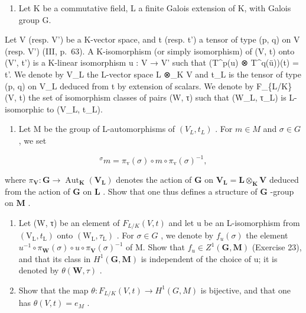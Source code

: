 \begin{enumerate}
\def\labelenumi{\arabic{enumi})}
\setcounter{enumi}{23}
\tightlist
\item
  Let K be a commutative field, L a finite Galois extension of K, with Galois group G.
\end{enumerate}

Let V (resp. V') be a K-vector space, and t (resp. t') a tensor of type (p, q) on V (resp. V') (III, p.~63). A K-isomorphism (or simply isomorphism) of (V, t) onto (V', t') is a K-linear isomorphism u : V → V' such that (T\^{}p(u) ⊗ T\^{}q(ü))(t) = t'. We denote by V\_L the L-vector space L ⊗\_K V and t\_L is the tensor of type (p, q) on V\_L deduced from t by extension of scalars. We denote by F\_\{L/K\}(V, t) the set of isomorphism classes of pairs (W, τ) such that (W\_L, τ\_L) is L-isomorphic to (V\_L, t\_L).

\begin{enumerate}
\def\labelenumi{\alph{enumi})}
\tightlist
\item
  Let M be the group of L-automorphisms of \((V_{L}, t_{L})\) . For \(m \in M\) and \(\sigma \in G\) , we set
\end{enumerate}

\[
{ } ^ { \sigma } m = \pi _ { \mathrm{v} } ( \sigma ) \circ m \circ \pi _ { \mathrm{v} } ( \sigma ) ^ { - 1 } ,
\]

where \(\pi_{\mathbf{V}}: \mathbf{G} \to \operatorname{Aut}_{\mathbf{K}}(\mathbf{V}_{\mathbf{L}})\) denotes the action of \(\mathbf{G}\) on \(\mathbf{V}_{\mathbf{L}} = \mathbf{L} \otimes_{\mathbf{K}} \mathbf{V}\) deduced from the action of \(\mathbf{G}\) on \(\mathbf{L}\) . Show that one thus defines a structure of \(\mathbf{G}\) -group on \(\mathbf{M}\) .

\begin{enumerate}
\def\labelenumi{\alph{enumi})}
\setcounter{enumi}{1}
\item
  Let (W, τ) be an element of \(F_{L/K}(V, t)\) and let u be an L-isomorphism from \((\mathrm{V}_{\mathrm{L}}, t_{\mathrm{L}})\) onto \((\mathrm{W}_{\mathrm{L}}, \tau_{\mathrm{L}})\) . For \(\sigma \in G\) , we denote by \(f_{u}(\sigma)\) the element \(u^{-1} \circ \pi_{\mathbf{W}}(\sigma) \circ u \circ \pi_{\mathbf{V}}(\sigma)^{-1}\) of M. Show that \(f_{u} \in Z^{1}(\mathbf{G}, \mathbf{M})\) (Exercise 23), and that its class in \(H^{1}(\mathbf{G}, \mathbf{M})\) is independent of the choice of u; it is denoted by \(\theta(\mathbf{W}, \tau)\) .
\item
  Show that the map \(\theta : F_{L/K}(V, t) \to H^1(G, M)\) is bijective, and that one has \(\theta(V, t) = e_M\) .
\end{enumerate}

